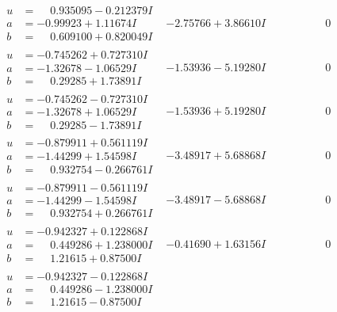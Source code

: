 \documentclass[1p]{elsarticle_modified}
\theoremstyle{definition}
\begin{document}
$$\begin{array}{c|c|c}
\begin{aligned}
u &= \phantom{-}0.935095 - 0.212379 I \\
a &= -0.99923 + 1.11674 I \\
b &= \phantom{-}0.609100 + 0.820049 I\end{aligned}
 & -2.75766 + 3.86610 I & \phantom{-0.000000 } 0 \\ \hline\begin{aligned}
u &= -0.745262 + 0.727310 I \\
a &= -1.32678 - 1.06529 I \\
b &= \phantom{-}0.29285 + 1.73891 I\end{aligned}
 & -1.53936 - 5.19280 I & \phantom{-0.000000 } 0 \\ \hline\begin{aligned}
u &= -0.745262 - 0.727310 I \\
a &= -1.32678 + 1.06529 I \\
b &= \phantom{-}0.29285 - 1.73891 I\end{aligned}
 & -1.53936 + 5.19280 I & \phantom{-0.000000 } 0 \\ \hline\begin{aligned}
u &= -0.879911 + 0.561119 I \\
a &= -1.44299 + 1.54598 I \\
b &= \phantom{-}0.932754 - 0.266761 I\end{aligned}
 & -3.48917 + 5.68868 I & \phantom{-0.000000 } 0 \\ \hline\begin{aligned}
u &= -0.879911 - 0.561119 I \\
a &= -1.44299 - 1.54598 I \\
b &= \phantom{-}0.932754 + 0.266761 I\end{aligned}
 & -3.48917 - 5.68868 I & \phantom{-0.000000 } 0 \\ \hline\begin{aligned}
u &= -0.942327 + 0.122868 I \\
a &= \phantom{-}0.449286 + 1.238000 I \\
b &= \phantom{-}1.21615 + 0.87500 I\end{aligned}
 & -0.41690 + 1.63156 I & \phantom{-0.000000 } 0 \\ \hline\begin{aligned}
u &= -0.942327 - 0.122868 I \\
a &= \phantom{-}0.449286 - 1.238000 I \\
b &= \phantom{-}1.21615 - 0.87500 I\end{aligned}

\end{array}$$
\end{document}
